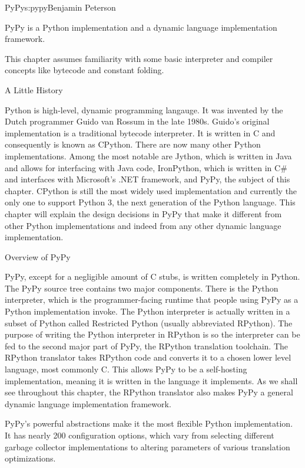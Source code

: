 \begin{aosachapter}{PyPy}{s:pypy}{Benjamin Peterson}

PyPy is a Python implementation and a dynamic language implementation framework.

This chapter assumes familiarity with some basic interpreter and compiler
concepts like bytecode and constant folding.

\begin{aosasect1}{A Little History}

Python is high-level, dynamic programming langauge. It was invented by the Dutch
programmer Guido van Rossum in the late 1980s. Guido's original implementation
is a traditional bytecode interpreter. It is written in C and consequently is
known as CPython. There are now many other Python implementations. Among the
most notable are Jython, which is written in Java and allows for interfacing
with Java code, IronPython, which is written in C\# and interfaces with
Microsoft's .NET framework, and PyPy, the subject of this chapter. CPython is
still the most widely used implementation and currently the only one to support
Python 3, the next generation of the Python language. This chapter will explain
the design decisions in PyPy that make it different from other Python
implementations and indeed from any other dynamic language implementation.

\end{aosasect1}

\begin{aosasect1}{Overview of PyPy}

PyPy, except for a negligible amount of C stubs, is written completely in
Python. The PyPy source tree contains two major components. There is the Python
interpreter, which is the programmer-facing runtime that people using PyPy as a
Python implementation invoke. The Python interpreter is actually written in a
subset of Python called Restricted Python (usually abbreviated RPython). The
purpose of writing the Python interpreter in RPython is so the interpreter can
be fed to the second major part of PyPy, the RPython translation toolchain. The
RPython translator takes RPython code and converts it to a chosen lower level
language, most commonly C. This allows PyPy to be a self-hosting implementation,
meaning it is written in the language it implements. As we shall see throughout
this chapter, the RPython translator also makes PyPy a general dynamic language
implementation framework.

PyPy's powerful abstractions make it the most flexible Python implementation. It
has nearly 200 configuration options, which vary from selecting different
garbage collector implementations to altering parameters of various translation
optimizations.


\end{aosasect1}
\end{aosachapter}
